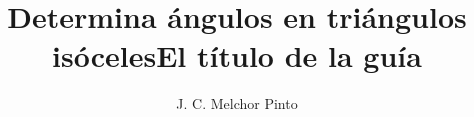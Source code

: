 \documentclass[12pt,addpoints,answers]{guia}
\title{Determina ángulos en triángulos isóceles}
\title{El título de la guía}
\author{J. C. Melchor Pinto}
\begin{document}
\pagestyle{headandfoot}

\INFO
\printanswers
\vspace{-0.5cm}
\begin{multicols}{2}
    
    
    \columnbreak
    
\end{multicols}

% 
% 
\begin{questions}
    \questionboxed[10]{}
    \questionboxed[10]{}
    \questionboxed[10]{}
    \questionboxed[10]{}
    \questionboxed[10]{}
    \questionboxed[10]{}
    \questionboxed[10]{}
    \questionboxed[10]{}
    \questionboxed[10]{}
    \questionboxed[10]{}
\end{questions}
\end{document}
